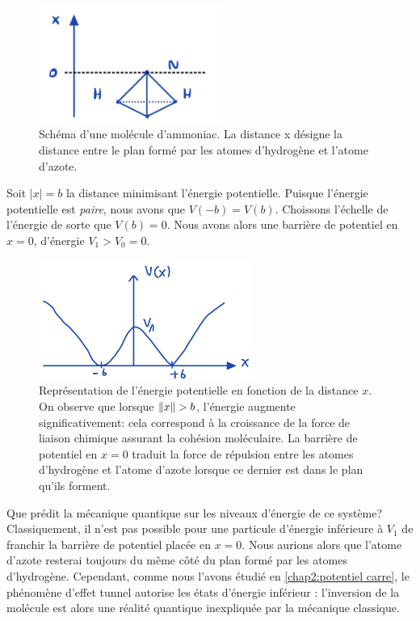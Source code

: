 \documentclass[../notesdecours.tex]{subfiles}
\begin{document}
\begin{figure}[h]
    \centering
    \includegraphics[width=60mm,scale=0.5]{Chapitre 5/Figure 1.jpg}
    \caption{Schéma d'une molécule d'ammoniac. La distance x désigne la distance entre le plan formé par les atomes d'hydrogène et l'atome d'azote.}
    \label{fig:Schema ammoniac}
\end{figure}

Soit $|x| = b$ la distance minimisant l'énergie potentielle. Puisque l'énergie potentielle est \emph{paire}, nous avons que $V(-b) = V(b)$. Choissons l'échelle de l'énergie de sorte que $V(b) = 0$. Nous avons alors une barrière de potentiel en $x = 0$, d'énergie $V_1 > V_0 = 0$.\\

\begin{figure}[h]
    \centering
    \includegraphics[width=70mm,scale=0.5]{Chapitre 5/Figure 2.jpg}
    \caption{Représentation de l'énergie potentielle en fonction de la distance $x$. On observe que lorsque $\norm{x}>b$, l'énergie augmente significativement: cela correspond à la croissance de la force de liaison chimique assurant la cohésion moléculaire. La barrière de potentiel en $x = 0$ traduit la force de répulsion entre les atomes d'hydrogène et l'atome d'azote lorsque ce dernier est dans le plan qu'ils forment.}
\end{figure}

Que prédit la mécanique quantique sur les niveaux d'énergie de ce système? Classiquement, il n'est pas possible pour une particule d'énergie inférieure à $V_1$ de franchir la barrière de potentiel placée en $x=0$. Nous aurions alors que l'atome d'azote resterai toujours du même côté du plan formé par les atomes d'hydrogène. Cependant, comme nous l'avons étudié en \ref{chap2:potentiel carre}, le phénomène d'effet tunnel autorise les états d'énergie inférieur : l'inversion de la molécule est alors une réalité quantique inexpliquée par la mécanique classique.\\
\end{document}
